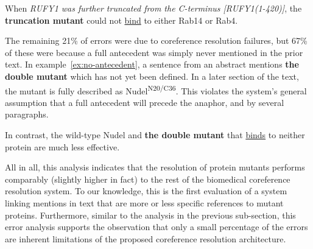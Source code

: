 \begin{exe}
	\ex\label{ex:longmut} When {\it RUFY1 was further truncated from the C-terminus [RUFY1(1-420)]}, the {\bf truncation mutant} could not \underline{bind} to either Rab14 or Rab4.
\end{exe}

The remaining 21\% of errors were due to coreference resolution failures, but 67\% of these were because a full antecedent was simply never mentioned in the prior text. In example~\ref{ex:no-antecedent}, a sentence from an abstract mentions {\bf the double mutant} which has not yet been defined. In a later section of the text, the mutant is fully described as Nudel\textsuperscript{N20/C36}. This violates the system's general assumption that a full antecedent will precede the anaphor, and by several paragraphs.

\begin{exe}
	\ex\label{ex:no-antecedent} In contrast, the wild-type Nudel and {\bf the double mutant} that \underline{binds} to neither protein are much less effective.
\end{exe}

All in all, this analysis indicates that the resolution of protein mutants performs comparably (slightly higher in fact) to the rest of the biomedical coreference resolution system. To our knowledge, this is the first evaluation of a system linking mentions in text that are more or less specific references to mutant proteins. Furthermore, similar to the analysis in the previous sub-section, this error analysis supports the observation that only a small percentage of the errors are inherent limitations of the proposed coreference resolution architecture. 

